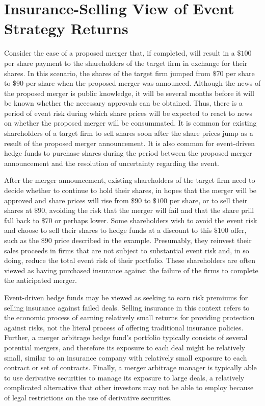 \documentclass[11pt]{article}
\begin{document}
\section*{Insurance-Selling View of Event Strategy Returns}
Consider the case of a proposed merger that, if completed, will result in a $\$ 100$ per share payment to the shareholders of the target firm in exchange for their shares. In this scenario, the shares of the target firm jumped from $\$ 70$ per share to $\$ 90$ per share when the proposed merger was announced. Although the news of the proposed merger is public knowledge, it will be several months before it will be known whether the necessary approvals can be obtained. Thus, there is a period of event risk during which share prices will be expected to react to news on whether the proposed merger will be consummated. It is common for existing shareholders of a target firm to sell shares soon after the share prices jump as a result of the proposed merger announcement. It is also common for event-driven hedge funds to purchase shares during the period between the proposed merger announcement and the resolution of uncertainty regarding the event.

After the merger announcement, existing shareholders of the target firm need to decide whether to continue to hold their shares, in hopes that the merger will be approved and share prices will rise from $\$ 90$ to $\$ 100$ per share, or to sell their shares at $\$ 90$, avoiding the risk that the merger will fail and that the share prill fall back to $\$ 70$ or perhaps lower. Some shareholders wish to avoid the event risk and choose to sell their shares to hedge funds at a discount to this $\$ 100$ offer, such as the $\$ 90$ price described in the example. Presumably, they reinvest their sales proceeds in firms that are not subject to substantial event risk and, in so doing, reduce the total event risk of their portfolio. These shareholders are often viewed as having purchased insurance against the failure of the firms to complete the anticipated merger.

Event-driven hedge funds may be viewed as seeking to earn risk premiums for selling insurance against failed deals. Selling insurance in this context refers to the economic process of earning relatively small returns for providing protection against risks, not the literal process of offering traditional insurance policies. Further, a merger arbitrage hedge fund's portfolio typically consists of several potential mergers, and therefore its exposure to each deal might be relatively small, similar to an insurance company with relatively small exposure to each contract or set of contracts. Finally, a merger arbitrage manager is typically able to use derivative securities to manage its exposure to large deals, a relatively complicated alternative that other investors may not be able to employ because of legal restrictions on the use of derivative securities.
\end{document}
